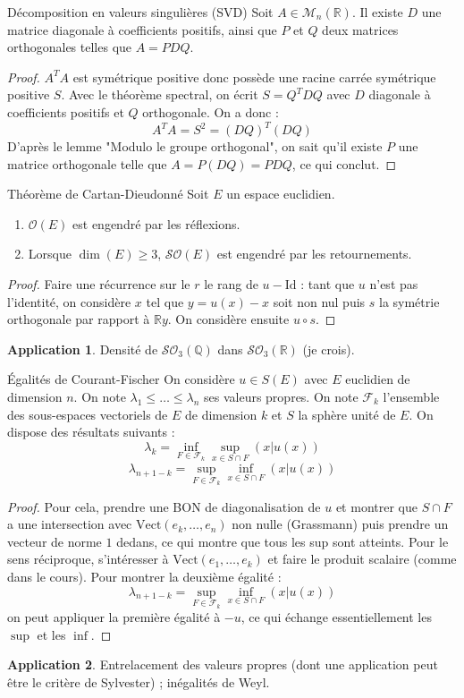 \documentclass[french]{article}
\newcommand{\Q}{\mathbb{Q}}
\newcommand{\R}{\mathbb{R}}
\theoremstyle{definition}
\newtheorem*{app}{Application}
\begin{document}
\begin{lem}{Décomposition en valeurs singulières (SVD)}
	Soit $A\in\mathcal{M}_n(\R)$. Il existe $D$ une matrice diagonale à coefficients positifs, ainsi que $P$ et $Q$ deux matrices orthogonales telles que $A=PDQ$.
\end{lem}
\begin{proof}
	$A^TA$ est symétrique positive donc possède une racine carrée symétrique positive $S$. Avec le théorème spectral, on écrit $S=Q^TDQ$ avec $D$ diagonale à coefficients positifs et $Q$ orthogonale. On a donc : $$A^TA=S^2=(DQ)^T(DQ)$$ D'après le lemme "Modulo le groupe orthogonal", on sait qu'il existe $P$ une matrice orthogonale telle que $A=P(DQ)=PDQ$, ce qui conclut.
\end{proof}

\begin{lem}{Théorème de Cartan-Dieudonné}
	Soit $E$ un espace euclidien.
	\begin{enumerate}
		\item $\mathcal{O}(E)$ est engendré par les réflexions.
		\item Lorsque $\dim(E)\geqslant 3$, $\mathcal{SO}(E)$ est engendré par les retournements.
	\end{enumerate}
\end{lem}
\begin{proof}
	Faire une récurrence sur le $r$ le rang de $u-\text{Id}$ : tant que $u$ n'est pas l'identité, on considère $x$ tel que $y=u(x)-x$ soit non nul puis $s$ la symétrie orthogonale par rapport à $\R y$. On considère ensuite $u\circ s$.
\end{proof}
\begin{app}
	Densité de $\mathcal{SO}_3(\Q)$ dans $\mathcal{SO}_3(\R)$ (je crois).
\end{app}

\begin{lem}{Égalités de Courant-Fischer}
	On considère $u\in S(E)$ avec $E$ euclidien de dimension $n$. On note $\lambda_1\leqslant\ldots\leqslant\lambda_n$ ses valeurs propres. On note $\mathcal{F}_k$ l'ensemble des sous-espaces vectoriels de $E$ de dimension $k$ et $S$ la sphère unité de $E$. On dispose des résultats suivants : $$\lambda_k=\inf_{F\in\mathcal{F}_k}\sup_{x\in S\cap F}(x|u(x))$$ $$\lambda_{n+1-k}=\sup_{F\in\mathcal{F}_k}\inf_{x\in S\cap F}(x|u(x))$$
\end{lem}
\begin{proof}
	Pour cela, prendre une BON de diagonalisation de $u$ et montrer que $S\cap F$ a une intersection avec $\text{Vect}(e_k,\ldots,e_n)$ non nulle (Grassmann) puis prendre un vecteur de norme $1$ dedans, ce qui montre que tous les sup sont atteints. Pour le sens réciproque, s'intéresser à $\text{Vect}(e_1,\ldots,e_k)$ et faire le produit scalaire (comme dans le cours). Pour montrer la deuxième égalité : $$\lambda_{n+1-k}=\sup_{F\in \mathcal{F}_k}\inf_{x\in S\cap F}(x|u(x))$$ on peut appliquer la première égalité à $-u$, ce qui échange essentiellement les $\sup$ et les $\inf$.
\end{proof}
\begin{app}
	Entrelacement des valeurs propres (dont une application peut être le critère de Sylvester) ; inégalités de Weyl.
\end{app}
\end{document}
